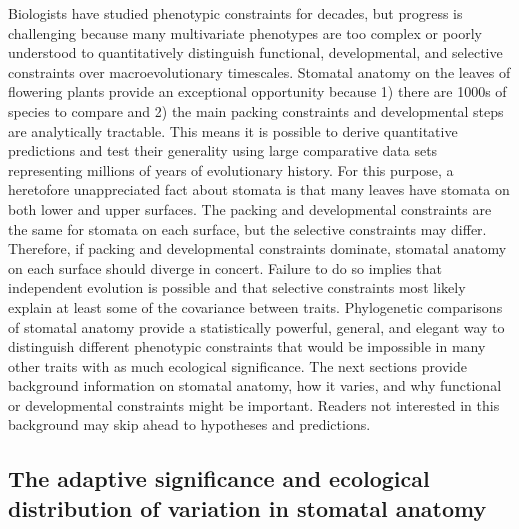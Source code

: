 \documentclass[
  12pt,
]{article}
\begin{document}
Biologists have studied phenotypic constraints for decades, but progress is challenging because many multivariate phenotypes are too complex or poorly understood to quantitatively distinguish functional, developmental, and selective constraints over macroevolutionary timescales. Stomatal anatomy on the leaves of flowering plants provide an exceptional opportunity because 1) there are 1000s of species to compare and 2) the main packing constraints and developmental steps are analytically tractable. This means it is possible to derive quantitative predictions and test their generality using large comparative data sets representing millions of years of evolutionary history. For this purpose, a heretofore unappreciated fact about stomata is that many leaves have stomata on both lower and upper surfaces. The packing and developmental constraints are the same for stomata on each surface, but the selective constraints may differ. Therefore, if packing and developmental constraints dominate, stomatal anatomy on each surface should diverge in concert. Failure to do so implies that independent evolution is possible and that selective constraints most likely explain at least some of the covariance between traits. Phylogenetic comparisons of stomatal anatomy provide a statistically powerful, general, and elegant way to distinguish different phenotypic constraints that would be impossible in many other traits with as much ecological significance. The next sections provide background information on stomatal anatomy, how it varies, and why functional or developmental constraints might be important. Readers not interested in this background may skip ahead to hypotheses and predictions.

\hypertarget{the-adaptive-significance-and-ecological-distribution-of-variation-in-stomatal-anatomy}{%
\subsection{The adaptive significance and ecological distribution of variation in stomatal anatomy}\label{the-adaptive-significance-and-ecological-distribution-of-variation-in-stomatal-anatomy}}
\end{document}

